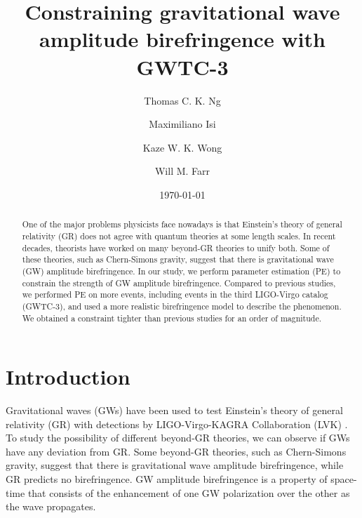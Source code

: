 \documentclass[aps,prd,twocolumn,superscriptaddress,preprintnumbers,floatfix,nofootinbib]{revtex4-2}
\begin{document}
\title{Constraining gravitational wave amplitude birefringence with GWTC-3}

\author{Thomas C. K. Ng}

\author{Maximiliano Isi}

\author{Kaze W. K. Wong}

\author{Will M. Farr}

\date{\today}

\begin{abstract}
    One of the major problems physicists face nowadays is that Einstein's theory of general relativity (GR) does not agree with quantum theories at some length scales.
    In recent decades, theorists have worked on many beyond-GR theories to unify both.
    Some of these theories, such as Chern-Simons gravity, suggest that there is gravitational wave (GW) amplitude birefringence.
    In our study, we perform parameter estimation (PE) to constrain the strength of GW amplitude birefringence.
    Compared to previous studies, we performed PE on more events, including events in the third LIGO-Virgo catalog (GWTC-3), and used a more realistic birefringence model to describe the phenomenon.
    We obtained a constraint tighter than previous studies for an order of magnitude.
\end{abstract}

\maketitle

\section{Introduction}
\label{sec:Introduction}
Gravitational waves (GWs) have been used to test Einstein's theory of general relativity (GR) with detections by LIGO-Virgo-KAGRA Collaboration (LVK) \citep{LIGO, Virgo, KAGRA}.
To study the possibility of different beyond-GR theories, we can observe if GWs have any deviation from GR.
Some beyond-GR theories, such as Chern-Simons gravity, suggest that there is gravitational wave amplitude birefringence, while GR predicts no birefringence.
GW amplitude birefringence is a property of space-time that consists of the enhancement of one GW polarization over the other as the wave propagates.
\end{document}
